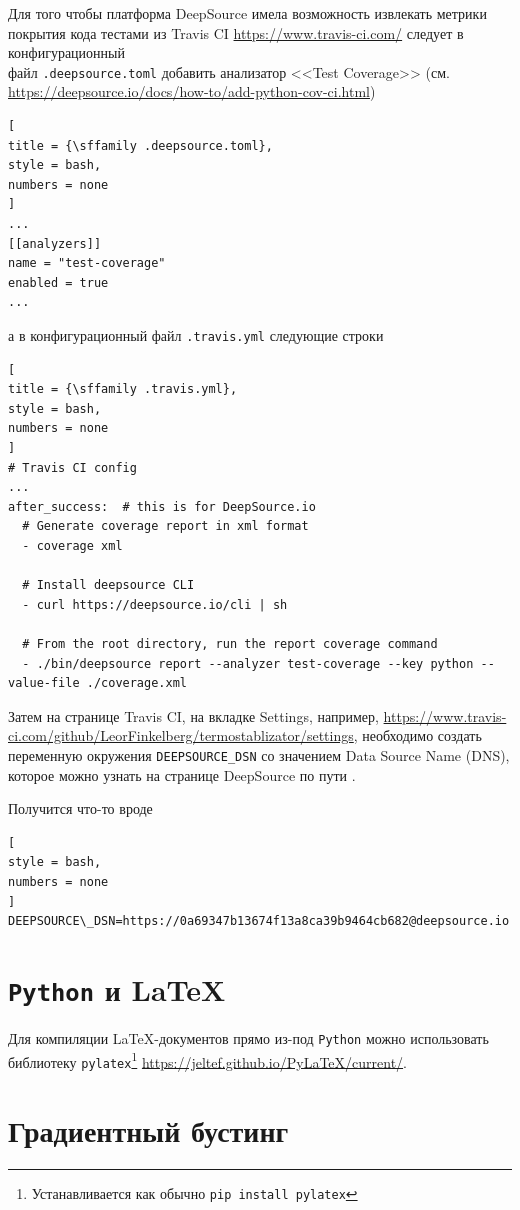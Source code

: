 \documentclass[%
	11pt,
	a4paper,
	utf8,
		]{article}
\begin{document}
Для того чтобы платформа DeepSource имела возможность извлекать метрики покрытия кода тестами из Travis CI \url{https://www.travis-ci.com/} следует в конфигурационный \\файл \texttt{.deepsource.toml} добавить анализатор <<Test Coverage>> (см. \url{https://deepsource.io/docs/how-to/add-python-cov-ci.html})
\begin{lstlisting}[
title = {\sffamily .deepsource.toml},
style = bash,
numbers = none	
]
...
[[analyzers]]
name = "test-coverage"
enabled = true
...
\end{lstlisting}
а в конфигурационный файл \texttt{.travis.yml} следующие строки
\begin{lstlisting}[
title = {\sffamily .travis.yml},
style = bash,
numbers = none	
]
# Travis CI config
...
after_success:  # this is for DeepSource.io
  # Generate coverage report in xml format
  - coverage xml

  # Install deepsource CLI
  - curl https://deepsource.io/cli | sh

  # From the root directory, run the report coverage command
  - ./bin/deepsource report --analyzer test-coverage --key python --value-file ./coverage.xml
\end{lstlisting}

Затем на странице Travis CI, на вкладке Settings, например, \url{https://www.travis-ci.com/github/LeorFinkelberg/termostablizator/settings}, необходимо создать переменную окружения \texttt{DEEPSOURCE\_DSN} со значением Data Source Name (DNS), которое можно узнать на странице DeepSource по пути .

Получится что-то вроде
\begin{lstlisting}[
style = bash,
numbers = none
]
DEEPSOURCE\_DSN=https://0a69347b13674f13a8ca39b9464cb682@deepsource.io
\end{lstlisting}




\section{\texttt{Python} и \LaTeX}

Для компиляции \LaTeX-документов прямо из-под \texttt{Python} можно использовать библиотеку \texttt{pylatex}\footnote{Устанавливается как обычно \texttt{pip install pylatex}} \url{https://jeltef.github.io/PyLaTeX/current/}.


\section{Градиентный бустинг}
\end{document}
